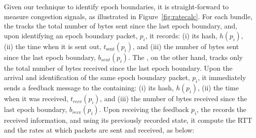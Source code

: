 Given our technique to identify epoch boundaries, it is straight-forward to measure congestion signals, as illustrated in Figure~\ref{fig:ratecalc}.
For each bundle, the \inbox tracks the total number of bytes sent since the last epoch boundary, and, upon identifying an epoch boundary packet, $p_i$, it records: (i) its hash, $h(p_i)$, (ii) the time when it is sent out, $t_{\text{sent}}(p_i)$, and (iii) the number of bytes sent since the last epoch boundary, $b_{sent}(p_i)$. 
The \outbox, on the other hand, tracks only the total number of bytes received since the last epoch boundary. Upon the arrival and identification of the same epoch boundary packet, $p_i$, it immediately sends a feedback message to the \inbox containing: (i) its hash, $h(p_i)$, (ii) the time when it was received, $t_{recv}(p_i)$, and (iii) the number of bytes received since the last epoch boundary, $b_{recv}(p_i)$. 
Upon receiving the feedback $p_i$, the \inbox records the received information, and using its previously recorded state, it compute the RTT and the rates at which packets are sent and received, as below:


